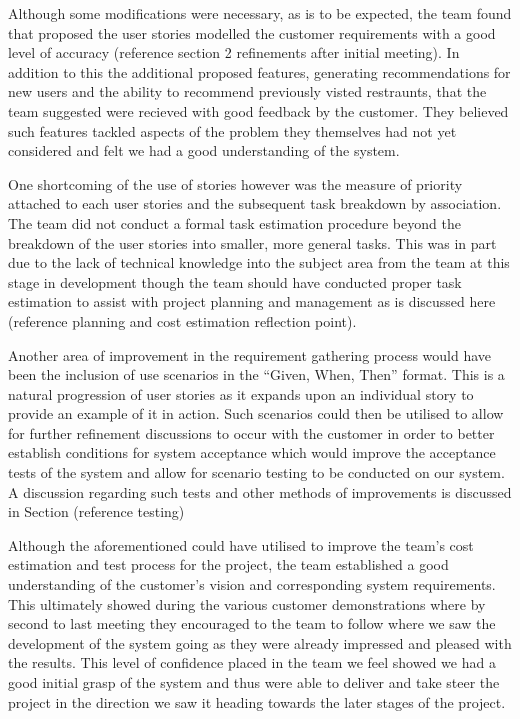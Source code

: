 \documentclass{l3proj}
\begin{document}
Although some modifications were necessary, as is to be expected, the team found that proposed the user stories modelled the customer requirements with a good level of accuracy (reference section 2 refinements after initial meeting). In addition to this the additional proposed features, generating recommendations for new users and the ability to recommend previously visted restraunts, that the team suggested were recieved with good feedback by the customer. They believed such features tackled aspects of the problem they themselves had not yet considered and felt we had a good understanding of the system. 

One shortcoming of the use of stories however was the measure of priority attached to each user stories and the subsequent task breakdown by association. The team did not conduct a formal task estimation procedure beyond the breakdown of the user stories into smaller, more general tasks. This was in part due to the lack of technical knowledge into the subject area from the team at this stage in development though the team should have conducted proper task estimation to assist with project planning and management as is discussed here (reference planning and cost estimation reflection point). 

Another area of improvement in the requirement gathering process would have been the inclusion of use scenarios in the “Given, When, Then” format. This is a natural progression of user stories as it expands upon an individual story to provide an example of it in action. Such scenarios could then be utilised to allow for further refinement discussions to occur with the customer in order to better establish conditions for system acceptance which would improve the acceptance tests of the system and allow for scenario testing to be conducted on our system. A discussion regarding such tests and other methods of improvements is discussed in Section (reference testing)  

Although the aforementioned could have utilised to improve the team's cost estimation and test process for the project, the team established a good understanding of the customer's vision and corresponding system requirements. This ultimately showed during the various customer demonstrations where by second to last meeting they encouraged to the team to follow where we saw the development of the system going as they were already impressed and pleased with the results. This level of confidence placed in the team we feel showed we had a good initial grasp of the system and thus were able to deliver and take steer the project in the direction we saw it heading towards the later stages of the project. 
\end{document}
